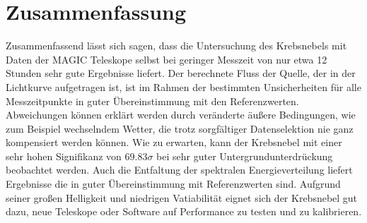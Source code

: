 \section{Zusammenfassung}
\label{sec:zusammenfassung}

Zusammenfassend lässt sich sagen, dass die Untersuchung des Krebsnebels mit Daten
der MAGIC Teleskope selbst bei geringer Messzeit von nur etwa 12 Stunden sehr gute
Ergebnisse liefert. Der berechnete Fluss der Quelle, der in der Lichtkurve
aufgetragen ist, ist im Rahmen der bestimmten Unsicherheiten für alle
Messzeitpunkte in guter Übereinstimmung mit den Referenzwerten. Abweichungen
können erklärt werden durch veränderte äußere Bedingungen, wie zum Beispiel
wechselndem Wetter, die trotz sorgfältiger Datenselektion nie ganz kompensiert
werden können. Wie zu erwarten, kann der Krebsnebel mit einer sehr hohen
Signifikanz von $\num{69.83}\sigma$ bei sehr guter Untergrundunterdrückung
beobachtet werden. Auch die Entfaltung der
spektralen Energieverteilung liefert Ergebnisse die in guter Übereinstimmung mit
Referenzwerten sind. Aufgrund seiner großen Helligkeit und niedrigen Vatiabilität
eignet sich der Krebsnebel gut dazu, neue Teleskope oder Software auf Performance
zu testen und zu kalibrieren.
